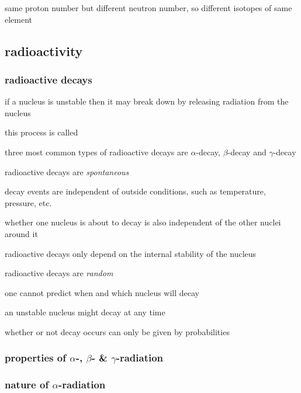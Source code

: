 same proton number but different neutron number, so different isotopes of same element \eoe




\subsection{radioactivity}

\subsubsection{radioactive decays}

if a nucleus is unstable then it may break down by releasing radiation from the nucleus

this process is called 

\cmt three most common types of radioactive decays are $\alpha$-decay, $\beta$-decay and $\gamma$-decay

\cmt radioactive decays are \emph{spontaneous}

decay events are independent of outside conditions, such as temperature, pressure, etc.

whether one nucleus is about to decay is also independent of the other nuclei around it

radioactive decays only depend on the internal stability of the nucleus

\cmt radioactive decays are \emph{random}

one cannot predict when and which nucleus will decay

an unstable nucleus might decay at any time

whether or not decay occurs can only be given by probabilities





\subsubsection{properties of \texorpdfstring{$\alpha$}{\textsubscript{\textalpha}}-, \texorpdfstring{$\beta$}{\textsubscript{\textbeta}}- \& \texorpdfstring{$\gamma$}{\textsubscript{\textgamma}}-radiation}

\subsubsection*{nature of \texorpdfstring{$\alpha$}{\textalpha}-radiation}

